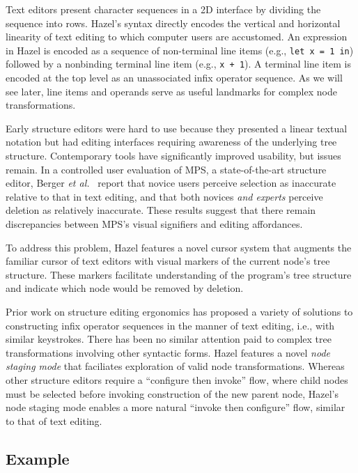 \documentclass[format=sigplan,dvipsnames,backend=bibtex]{acmart}
\newcommand{\Hazel}{\textsf{Hazel}\xspace}
\begin{document}
Text editors present character sequences in a 2D interface by dividing the
	sequence into rows.
\Hazel's syntax directly encodes the vertical and horizontal linearity of text
	editing to which computer users are accustomed.
An expression in \Hazel is encoded as a sequence of non-terminal line items
	(e.g., \texttt{let x = 1 in}) followed by a nonbinding terminal line item
	(e.g., \texttt{x + 1}). 
A terminal line item is encoded at the top level as an unassociated infix operator sequence.
As we will see later, line items and operands serve as useful landmarks for complex
	node transformations.

Early structure editors were hard to use because they presented a linear textual notation
	but had editing interfaces requiring awareness of the underlying tree structure.
Contemporary tools have significantly improved usability, but issues remain.
In a controlled user evaluation of MPS, a state-of-the-art structure editor,
	Berger \emph{et al.}~ \cite{ProjEfficiency}
	report that novice users perceive selection as inaccurate relative to that in text
	editing, and that both novices \emph{and experts} perceive deletion as relatively inaccurate.
These results suggest that there remain discrepancies between MPS's visual 
	signifiers and editing affordances.

To address this problem, \Hazel features a novel cursor system that augments the familiar
	cursor of text editors with visual markers of the current node's tree structure.
These markers facilitate understanding of the program's tree structure and indicate
	which node would be removed by deletion.

Prior work on structure editing ergonomics has proposed a variety of solutions to 
	constructing infix operator sequences in the manner of text editing, i.e., with similar 
	keystrokes.
There has been no similar attention paid to complex tree transformations involving other 
	syntactic forms.
\Hazel features a novel \emph{node staging mode} that faciliates exploration of valid
	node transformations.
Whereas other structure editors require a ``configure then invoke'' flow, where child
	nodes must be selected before invoking construction of the new parent node, \Hazel's
	node staging mode enables a more natural ``invoke then configure'' flow, similar to
	that of text editing.

\subsection{Example}
\end{document}

